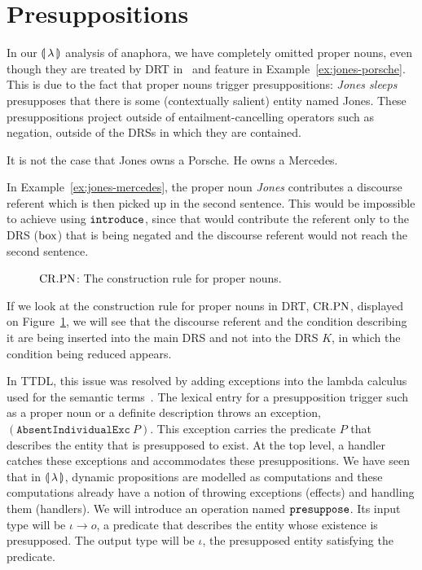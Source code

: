 \section{Presuppositions}
\label{sec:presuppositions}

In our $\llparenthesis \, \lambda \, \rrparenthesis$ analysis of anaphora, we have completely omitted
proper nouns, even though they are treated by DRT
in~\cite{kamp1993discourse} and feature in
Example~\ref{ex:jones-porsche}. This is due to the fact that proper nouns
trigger presuppositions: \emph{Jones sleeps} presupposes that there is some
(contextually salient) entity named Jones. These presuppositions project
outside of entailment-cancelling operators such as negation, outside of the
DRSs in which they are contained.

\begin{exe}
  \ex \label{ex:jones-mercedes} It is not the case that Jones owns a
  Porsche. He owns a Mercedes.
\end{exe}

In Example~\ref{ex:jones-mercedes}, the proper noun \emph{Jones}
contributes a discourse referent which is then picked up in the second
sentence. This would be impossible to achieve using $\mathtt{introduce}$, since
that would contribute the referent only to the DRS ($\mathrm{box}$) that is being
negated and the discourse referent would not reach the second sentence.

\begin{figure}
\centering
\crpnbox
\caption{\label{fig:crpn} $\mathrm{CR.PN}$: The construction rule for proper nouns.}
\end{figure}

If we look at the construction rule for proper nouns in DRT, $\mathrm{CR.PN}$,
displayed on Figure~\ref{fig:crpn}, we will see that the discourse referent
and the condition describing it are being inserted into the main DRS and
not into the DRS $K$, in which the condition being reduced appears.

In TTDL, this issue was resolved by adding exceptions into the lambda
calculus used for the semantic terms~\cite{lebedeva2012expression}. The
lexical entry for a presupposition trigger such as a proper noun or a
definite description throws an exception,
$(\texttt{AbsentIndividualExc}\ P)$. This exception carries the predicate
$P$ that describes the entity that is presupposed to exist. At the top
level, a handler catches these exceptions and accommodates these
presuppositions. We have seen that in $\llparenthesis \, \lambda \, \rrparenthesis$, dynamic
propositions are modelled as computations and these computations already
have a notion of throwing exceptions (effects) and handling them
(handlers). We will introduce an operation named $\mathtt{presuppose}$. Its
input type will be $\iota \to o$, a predicate that describes the entity
whose existence is presupposed. The output type will be $\iota$, the
presupposed entity satisfying the predicate.

